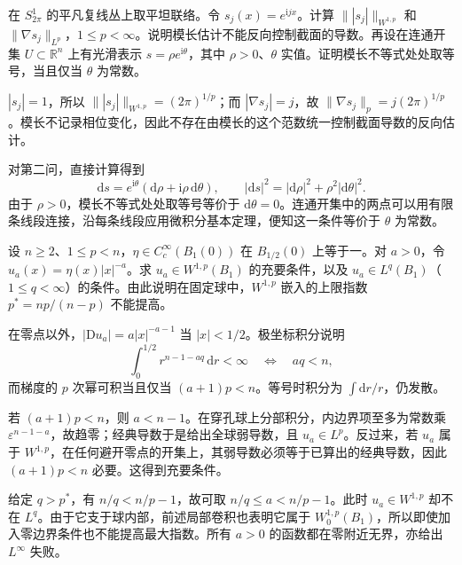\begin{exercise}\label{g3:ex:bundle-modulus-sharpness}
	在 \(S^1_{2\pi}\) 的平凡复线丛上取平坦联络。令 \(s_j(x)=e^{\mathrm ijx}\)。计算 \(\||s_j|\|_{W^{1,p}}\) 和 \(\|\nabla s_j\|_{L^p}\)，\(1\le p<\infty\)。说明模长估计不能反向控制截面的导数。再设在连通开集 \(U\subset\mathbb R^n\) 上有光滑表示 \(s=\rho e^{\mathrm i\theta}\)，其中 \(\rho>0\)、\(\theta\) 实值。证明模长不等式处处取等号，当且仅当 \(\theta\) 为常数。
\end{exercise}
\begin{solution}
	\(|s_j|=1\)，所以 \(\||s_j|\|_{W^{1,p}}=(2\pi)^{1/p}\)；而 \(|\nabla s_j|=j\)，故 \(\|\nabla s_j\|_p=j(2\pi)^{1/p}\)。模长不记录相位变化，因此不存在由模长的这个范数统一控制截面导数的反向估计。

	对第二问，直接计算得到
	\[
		\mathrm ds=e^{\mathrm i\theta}(\mathrm d\rho+\mathrm i\rho\,\mathrm d\theta),
		\qquad |\mathrm ds|^2=|\mathrm d\rho|^2+\rho^2|\mathrm d\theta|^2.
	\]
	由于 \(\rho>0\)，模长不等式处处取等号等价于 \(\mathrm d\theta=0\)。连通开集中的两点可以用有限条线段连接，沿每条线段应用微积分基本定理，便知这一条件等价于 \(\theta\) 为常数。
\end{solution}

\begin{exercise}\label{g3:ex:radial-sobolev-threshold}
	设 \(n\ge2\)、\(1\le p<n\)，\(\eta\in C_c^\infty(B_1(0))\) 在 \(B_{1/2}(0)\) 上等于一。对 \(a>0\)，令 \(u_a(x)=\eta(x)|x|^{-a}\)。求 \(u_a\in W^{1,p}(B_1)\) 的充要条件，以及 \(u_a\in L^q(B_1)\)（\(1\le q<\infty\)）的条件。由此说明在固定球中，\(W^{1,p}\) 嵌入的上限指数 \(p^*=np/(n-p)\) 不能提高。
\end{exercise}
\begin{solution}
	在零点以外，\(|\mathrm Du_a|=a|x|^{-a-1}\) 当 \(|x|<1/2\)。极坐标积分说明
	\[
		\int_0^{1/2}r^{n-1-aq}\,\mathrm dr<\infty
		\quad\Longleftrightarrow\quad aq<n,
	\]
	而梯度的 \(p\) 次幂可积当且仅当 \((a+1)p<n\)。等号时积分为 \(\int\mathrm dr/r\)，仍发散。

	若 \((a+1)p<n\)，则 \(a<n-1\)。在穿孔球上分部积分，内边界项至多为常数乘 \(\varepsilon^{n-1-a}\)，故趋零；经典导数于是给出全球弱导数，且 \(u_a\in L^p\)。反过来，若 \(u_a\) 属于 \(W^{1,p}\)，在任何避开零点的开集上，其弱导数必须等于已算出的经典导数，因此 \((a+1)p<n\) 必要。这得到充要条件。

	给定 \(q>p^*\)，有 \(n/q<n/p-1\)，故可取
	\(n/q\le a<n/p-1\)。此时 \(u_a\in W^{1,p}\) 却不在 \(L^q\)。由于它支于球内部，前述局部卷积也表明它属于 \(W_0^{1,p}(B_1)\)，所以即使加入零边界条件也不能提高最大指数。所有 \(a>0\) 的函数都在零附近无界，亦给出 \(L^\infty\) 失败。
\end{solution}

